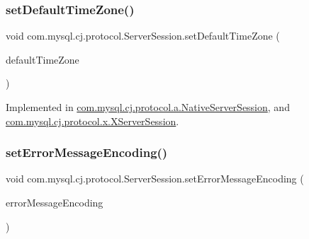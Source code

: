 \mbox{\label{interfacecom_1_1mysql_1_1cj_1_1protocol_1_1_server_session_ae27787e7922817a157fdf6208e868756}} 
\subsubsection{\texorpdfstring{set\+Default\+Time\+Zone()}{setDefaultTimeZone()}}
{\footnotesize\ttfamily void com.\+mysql.\+cj.\+protocol.\+Server\+Session.\+set\+Default\+Time\+Zone (\begin{DoxyParamCaption}\item[{Time\+Zone}]{default\+Time\+Zone }\end{DoxyParamCaption})}



Implemented in \mbox{\hyperlink{classcom_1_1mysql_1_1cj_1_1protocol_1_1a_1_1_native_server_session_a0136e27d19a065030e8acd8b855a1662}{com.\+mysql.\+cj.\+protocol.\+a.\+Native\+Server\+Session}}, and \mbox{\hyperlink{classcom_1_1mysql_1_1cj_1_1protocol_1_1x_1_1_x_server_session_a10e130d79476b1e117a213ee9014c877}{com.\+mysql.\+cj.\+protocol.\+x.\+X\+Server\+Session}}.

\mbox{\label{interfacecom_1_1mysql_1_1cj_1_1protocol_1_1_server_session_a05ff2ff3c3265cb245ca9f1ff708d457}} 
\subsubsection{\texorpdfstring{set\+Error\+Message\+Encoding()}{setErrorMessageEncoding()}}
{\footnotesize\ttfamily void com.\+mysql.\+cj.\+protocol.\+Server\+Session.\+set\+Error\+Message\+Encoding (\begin{DoxyParamCaption}\item[{String}]{error\+Message\+Encoding }\end{DoxyParamCaption})}



